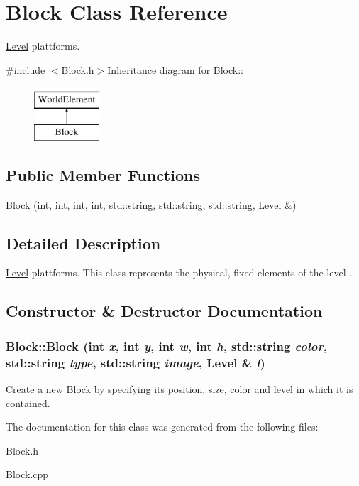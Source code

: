 \hypertarget{classBlock}{
\section{Block Class Reference}
\label{classBlock}
}


\hyperlink{classLevel}{Level} plattforms.  


{\ttfamily \#include $<$Block.h$>$}Inheritance diagram for Block::\begin{figure}[H]
\begin{center}
\leavevmode
\includegraphics[height=2cm]{classBlock}
\end{center}
\end{figure}
\subsection*{Public Member Functions}
\begin{DoxyCompactItemize}
\item 
\hyperlink{classBlock_a7f310368f69006397e5b7256ab80932b}{Block} (int, int, int, int, std::string, std::string, std::string, \hyperlink{classLevel}{Level} \&)
\end{DoxyCompactItemize}


\subsection{Detailed Description}
\hyperlink{classLevel}{Level} plattforms. This class represents the physical, fixed elements of the level . 

\subsection{Constructor \& Destructor Documentation}
\hypertarget{classBlock_a7f310368f69006397e5b7256ab80932b}{
\subsubsection[{Block}]{\setlength{\rightskip}{0pt plus 5cm}Block::Block (int {\em x}, \/  int {\em y}, \/  int {\em w}, \/  int {\em h}, \/  std::string {\em color}, \/  std::string {\em type}, \/  std::string {\em image}, \/  {\bf Level} \& {\em l})}}
\label{classBlock_a7f310368f69006397e5b7256ab80932b}
Create a new \hyperlink{classBlock}{Block} by specifying its position, size, color and level in which it is contained. 

The documentation for this class was generated from the following files:\begin{DoxyCompactItemize}
\item 
Block.h\item 
Block.cpp\end{DoxyCompactItemize}
